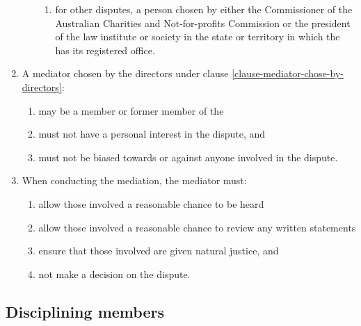 \documentclass[a4paper]{article}
\let\emph\relax
\begin{document}
\begin{enumerate}
\begin{enumerate}
\begin{enumerate}
        \item for other disputes, a person chosen by either the Commissioner of the Australian Charities and Not-for-profits Commission or the president of the law institute or society in the state or territory in which the \emph{company} has its registered office.
        \end{enumerate}
    \end{enumerate}
\item A mediator chosen by the directors under clause \ref{clause-mediator-chose-by-directors}:
    \begin{enumerate}
    \item may be a member or former member of the \emph{company}
    \item must not have a personal interest in the dispute, and
    \item must not be biased towards or against anyone involved in the dispute.
    \end{enumerate}
\item When conducting the mediation, the mediator must:
    \begin{enumerate}
    \item allow those involved a reasonable chance to be heard
    \item allow those involved a reasonable chance to review any written statements
    \item ensure that those involved are given natural justice, and
    \item not make a decision on the dispute.
    \end{enumerate}
\end{enumerate}

\subsection{Disciplining members}
\label{subsection-disciplining-members}
\end{document}
